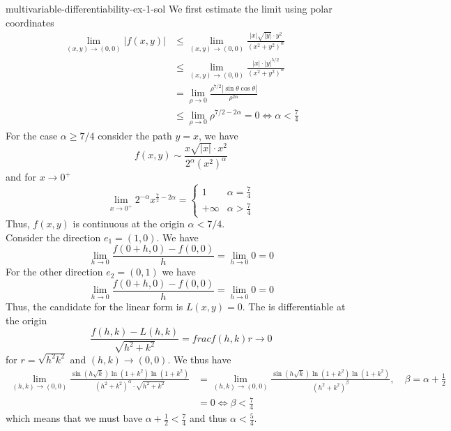 \documentclass[preview]{standalone}
\begin{document}
\begin{snippetsolution}{multivariable-differentiability-ex-1-sol}{}
    We first estimate the limit using polar coordinates
    \begin{align*}
        \lim_{(x,y) \to (0,0)} |f(x,y)| &\leq
        \lim_{(x,y) \to (0,0)} \frac{|x| \sqrt{|y|}\cdot y^2}{{(x^2 + y^2)}^\alpha} \\
        &\leq \lim_{(x,y) \to (0,0)}\frac{|x| \cdot {|y|}^{5/2}}{{(x^2 + y^2)}^\alpha} \\
        &= \lim_{\rho \to 0} \frac{\rho^{7/2} |\sin\theta\cos\theta|}{\rho^{2\alpha}} \\
        &\leq \lim_{\rho \to 0} \rho^{7/2 - 2\alpha} = 0 \iff \alpha < \frac74
    \end{align*}
    For the case \(\alpha \geq 7/4\) consider the path \(y=x\), we have
    \[
        f(x,y) \sim \frac{x\sqrt{|x|} \cdot x^2}{2^\alpha {(x^2)}^\alpha}
    \]
    and for \(x\to 0^+\)
    \[
        \lim_{x\to 0^+} 2^{-\alpha} x^{\frac{7}{2} - 2\alpha}
        = \begin{cases}
            1 & \alpha = \frac{7}{4} \\
            +\infty & \alpha > \frac{7}{4}
        \end{cases}
    \]
    Thus, \(f(x,y)\) is continuous at the origin \ifandonlyif \(\alpha < 7/4\). \\
    Consider the direction \(e_1 = (1,0)\). We have
    \[
        \lim_{h\to 0} \frac{f(0 + h, 0) - f(0,0)}{h} = \lim_{h\to 0} 0 = 0
    \]
    For the other direction \(e_2 =(0,1)\) we have
    \[
        \lim_{h\to 0} \frac{f(0 + h, 0) - f(0,0)}{h} = \lim_{h\to 0} 0 = 0
    \]
    Thus, the candidate for the linear form is \(L(x,y) = 0\). The \function is differentiable
    at the origin \ifandonlyif
    \[
        \frac{f(h,k) - L(h,k)}{\sqrt{h^2 + k^2}} = frac{f(h,k)}r \to 0
    \]
    for \(r = \sqrt{h^2  k^2}\) and \((h,k) \to (0,0)\).
    We thus have
    \begin{align*}
        \lim_{(h,k) \to (0,0)} \frac{\sin (h\sqrt{k}) \ln(1 + k^2) \ln(1 + k^2)}{
            {(h^2 + k^2)}^\alpha \cdot \sqrt{h^2 + k^2}
        }
        &= \lim_{(h,k) \to (0,0)}\frac{\sin (h\sqrt{k}) \ln(1 + k^2) \ln(1 + k^2)}{
            {(h^2 + k^2)}^\beta
        }, \quad \beta = \alpha + \frac12 \\
        &=0 \iff \beta < \frac74
    \end{align*}
    which means that we must bave \(\alpha + \frac12 < \frac74\)
    and thus \(\alpha < \frac54\).
\end{snippetsolution}
\end{document}
